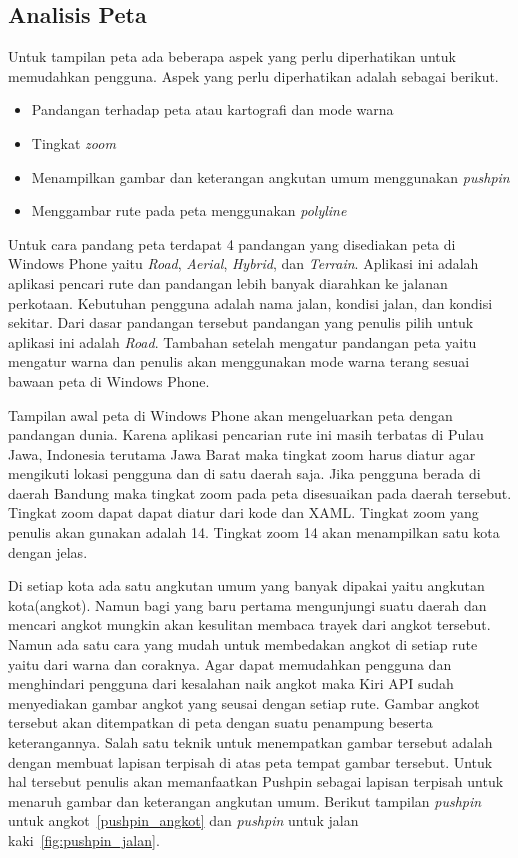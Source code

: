 \subsection{Analisis Peta}
\label{lab:Analisis Peta}
\hspace{0.5cm} Untuk tampilan peta ada beberapa aspek yang perlu diperhatikan untuk memudahkan pengguna. Aspek yang perlu diperhatikan adalah sebagai berikut.
\begin{itemize}
	\item Pandangan terhadap peta atau kartografi dan mode warna
	\item Tingkat \textit{zoom}
	\item Menampilkan gambar dan keterangan angkutan umum menggunakan \textit{pushpin}
	\item Menggambar rute pada peta menggunakan \textit{polyline}
\end{itemize}

\hspace{0.5cm} Untuk cara pandang peta terdapat 4 pandangan yang disediakan peta di Windows Phone yaitu \textit{Road}, \textit{Aerial}, \textit{Hybrid}, dan \textit{Terrain}. Aplikasi ini adalah aplikasi pencari rute dan pandangan lebih banyak diarahkan ke jalanan perkotaan. Kebutuhan pengguna adalah nama jalan, kondisi jalan, dan kondisi sekitar. Dari dasar pandangan tersebut pandangan yang penulis pilih untuk aplikasi ini adalah \textit{Road}. Tambahan setelah mengatur pandangan peta yaitu mengatur warna dan penulis akan menggunakan mode warna terang sesuai bawaan peta di Windows Phone.

\hspace{0.5cm} Tampilan awal peta di Windows Phone akan mengeluarkan peta dengan pandangan dunia. Karena aplikasi pencarian rute ini masih terbatas di Pulau Jawa, Indonesia terutama Jawa Barat maka tingkat zoom harus diatur agar mengikuti lokasi pengguna dan di satu daerah saja. Jika pengguna berada di daerah Bandung maka tingkat zoom pada peta disesuaikan pada daerah tersebut. Tingkat zoom dapat dapat diatur dari kode dan XAML. Tingkat zoom yang penulis akan gunakan adalah 14. Tingkat zoom 14 akan menampilkan satu kota dengan jelas.

\hspace{0.5cm} Di setiap kota ada satu angkutan umum yang banyak dipakai yaitu angkutan kota(angkot). Namun bagi yang baru pertama mengunjungi suatu daerah dan mencari angkot mungkin akan kesulitan membaca trayek dari angkot tersebut. Namun ada satu cara yang mudah untuk membedakan angkot di setiap rute yaitu dari warna dan coraknya. Agar dapat memudahkan pengguna dan menghindari pengguna dari kesalahan naik angkot maka Kiri API sudah menyediakan gambar angkot yang seusai dengan setiap rute. Gambar angkot tersebut akan ditempatkan di peta dengan suatu penampung beserta keterangannya. Salah satu teknik untuk menempatkan gambar tersebut adalah dengan membuat lapisan terpisah di atas peta tempat gambar tersebut. Untuk hal tersebut penulis akan memanfaatkan Pushpin sebagai lapisan terpisah untuk menaruh gambar dan keterangan angkutan umum. Berikut tampilan \textit{pushpin} untuk angkot~\ref{pushpin_angkot} dan \textit{pushpin} untuk jalan kaki~\ref{fig:pushpin_jalan}.

